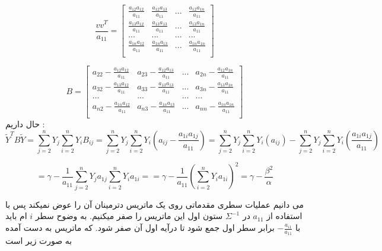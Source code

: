 \[
    \frac{vv^T}{a_{11}} = \begin{bmatrix}
    \frac{a_{12}a_{12}}{a_{11}} & \frac{a_{12}a_{13}}{a_{11}} & ... &\frac{a_{12}a_{1n}}{a_{11}} \\
    \frac{a_{13}a_{12}}{a_{11}} & \frac{a_{13}a_{13}}{a_{11}} & ... & \frac{a_{13}a_{1n}}{a_{11}} \\
    ... & ... & ... & ... \\
    \frac{a_{1n}a_{12}}{a_{11}} & \frac{a_{1n}a_{13}}{a_{11}} & ... & \frac{a_{1n}a_{1n}}{a_{11}} \\
\end{bmatrix}
\]

\[
    B = \begin{bmatrix}
    a_{22} - \frac{a_{12}a_{12}}{a_{11}}  & a_{23} -\frac{a_{12}a_{13}}{a_{11}} & ... &a_{2n} - \frac{a_{12}a_{1n}}{a_{11}} \\
    a_{32} - \frac{a_{13}a_{12}}{a_{11}} & a_{33} - \frac{a_{13}a_{13}}{a_{11}} & ... & a_{3n} - \frac{a_{13}a_{1n}}{a_{11}} \\
    ... & ... & ... & ... \\
    a_{n2} - \frac{a_{1n}a_{12}}{a_{11}} & a_{n3} - \frac{a_{1n}a_{13}}{a_{11}} & ... & a_{nn} - \frac{a_{1n}a_{1n}}{a_{11}} \\
\end{bmatrix}
\]
 حال داریم :
\[ \tilde{Y}^{T}B\tilde{Y} = \sum_{j = 2}^{n}{Y_j \sum_{i = 2}^{n}{Y_i B_{ij}}} = 
\sum_{j = 2}^{n}{Y_j \sum_{i = 2}^{n}{Y_i (a_{ij} - \frac{a_{1i}a_{1j}}{a_{11}})}}
= \sum_{j = 2}^{n}{Y_j \sum_{i = 2}^{n}{Y_i (a_{ij})}}
- \sum_{j = 2}^{n}{Y_j \sum_{i = 2}^{n}{Y_i (\frac{a_{1i}a_{1j}}{a_{11}})}}
\]

\[ 
    = \gamma - \frac{1}{a_{11}}\sum_{j = 2}^{n}{Y_j a_{1j}\sum_{i = 2}^{n}{Y_i {a_{1i}}}} = 
    = \gamma - \frac{1}{a_{11}}(\sum_{i = 2}^{n}{Y_i a_{1i}})^2
    = \gamma - \frac{\beta ^2}{\alpha}
\]

\parte{}

می دانیم عملیات سطری مقدماتی روی یک ماتریس دترمینان آن را عوض نمیکند پس با استفاده از $a_{11}$ در $\Sigma^{-1}$ ستون اول این ماتریس را صفر میکنیم.
به وضوح سطر $i$ ام باید با $-\frac{a_{i1}}{a_{11}}$ برابر سطر اول جمع شود تا درآیه اول آن صفر شود.
که ماتریس به دست آمده به صورت زیر است \\

